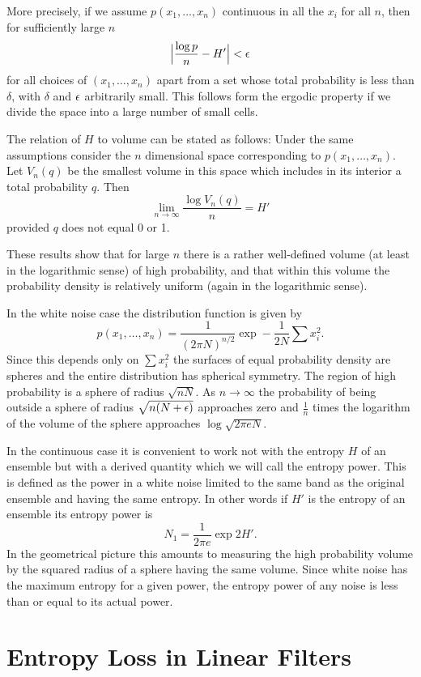 More precisely, if we assume $p(x_1,\dots,x_n)$ continuous in all the
$x_i$ for all $n$, then for sufficiently large $n$
$$
\Bigl|\frac{\log p}{n}-H'\Bigr|<\epsilon
$$
for all choices of $(x_1,\dots,x_n)$ apart from a set whose total
probability is less than $\delta$, with $\delta$ and $\epsilon$ arbitrarily
small.  This follows form the ergodic property if we divide the space
into a large number of small cells.

The relation of $H$ to volume can be stated as follows:  Under the same
assumptions consider the $n$ dimensional space corresponding to
$p(x_1,\dots,x_n)$.  Let $V_n(q)$ be the smallest volume in this space
which includes in its interior a total probability $q$.  Then
$$
\lim_{n\to\infty}\frac{\log V_n(q)}{n}=H'
$$
provided $q$ does not equal 0 or 1.

These results show that for large $n$ there is a rather well-defined
volume (at least in the logarithmic sense) of high probability, and that
within this volume the probability density is relatively uniform (again
in the logarithmic sense).

In the white noise case the distribution function is given by
$$
p(x_1,\dots,x_n)=\frac{1}{(2\pi N)^{n/2}}\exp -\frac{1}{2N}\sum x_i^2.
$$
Since this depends only on $\sum x_i^2$ the surfaces of equal
probability density are spheres and the entire distribution has spherical
symmetry.  The region of high probability is a sphere of radius $\sqrt{n
N}$.  As $n\to\infty$ the probability of being outside a sphere of
radius $\sqrt{n(N+\epsilon)}$ approaches zero and
$\frac1n$ times the logarithm of the volume of the sphere
approaches $\log\sqrt{2\pi e N}$.

In the continuous case it is convenient to work not with the entropy $H$
of an ensemble but with a derived quantity which we will call the
entropy power.  This is defined as the power in a white noise
limited to the same band as the original ensemble and having the same
entropy.  In other words if $H'$ is the entropy of an ensemble its
entropy power is
$$
N_1=\frac{1}{2\pi e}\exp 2H'.
$$
In the geometrical picture this amounts to measuring the high
probability volume by the squared radius of a sphere having the same
volume.  Since white noise has the maximum entropy for a given power,
the entropy power of any noise is less than or equal to its actual
power.

\section{Entropy Loss in Linear Filters}

